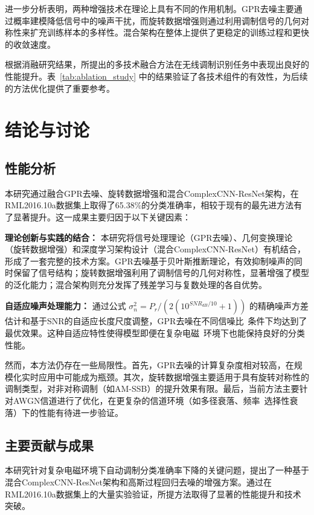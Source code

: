 \documentclass{article}
\begin{document}
进一步分析表明，两种增强技术在理论上具有不同的作用机制。GPR去噪主要通过概率建模降低信号中的噪声干扰，而旋转数据增强则通过利用调制信号的几何对称性来扩充训练样本的多样性。混合架构在整体上提供了更稳定的训练过程和更快的收敛速度。

根据消融研究结果，所提出的多技术融合方法在无线调制识别任务中表现出良好的性能提升。表~\ref{tab:ablation_study} 中的结果验证了各技术组件的有效性，为后续的方法优化提供了重要参考。


\section{结论与讨论}

\subsection{性能分析}

本研究通过融合GPR去噪、旋转数据增强和混合ComplexCNN-ResNet架构，在RML2016.10a数据集上取得了65.38\%的分类准确率，相较于现有的最先进方法有了显著提升。这一成果主要归因于以下关键因素：

\textbf{理论创新与实践的结合：} 本研究将信号处理理论（GPR去噪）、几何变换理论（旋转数据增强）和深度学习架构设计（混合ComplexCNN-ResNet）有机结合，形成了一套完整的技术方案。GPR去噪基于贝叶斯推断理论，有效抑制噪声的同时保留了信号结构；旋转数据增强利用了调制信号的几何对称性，显著增强了模型的泛化能力；混合架构则充分发挥了残差学习与复数处理的各自优势。

\textbf{自适应噪声处理能力：} 通过公式 $\sigma_n^2 = P_r/(2(10^{SNR_{dB}/10} + 1))$ 的精确噪声方差估计和基于SNR的自适应长度尺度调整，GPR去噪在不同信噪比~条件下均达到了最优效果。这种自适应特性使得模型即便在复杂电磁~环境下也能保持良好的分类性能。

然而，本方法仍存在一些局限性。首先，GPR去噪的计算复杂度相对较高，在规模化实时应用中可能成为瓶颈。其次，旋转数据增强主要适用于具有旋转对称性的调制类型，对非对称调制（如AM-SSB）的提升效果有限。最后，当前方法主要针对AWGN信道进行了优化，在更复杂的信道环境（如多径衰落、频率~选择性衰落）下的性能有待进一步验证。

\subsection{主要贡献与成果}

本研究针对复杂电磁环境下自动调制分类准确率下降的关键问题，提出了一种基于混合ComplexCNN-ResNet架构和高斯过程回归去噪的增强方案。通过在RML2016.10a数据集上的大量实验验证，所提方法取得了显著的性能提升和技术突破。
\end{document}
